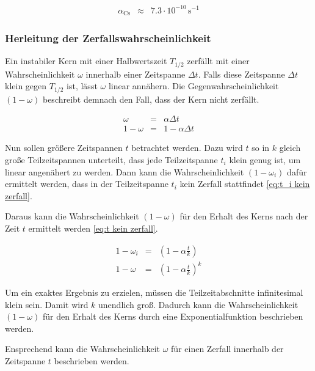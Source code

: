 \documentclass[12pt,a4paper]{scrartcl}
\numberwithin{equation}{section} %
\renewcommand{\[}{} %
\renewcommand{\]}{\noindent} %
\begin{document}
\begin{eqnarray}
	\alpha_\mathrm{Cs} &\approx& 7.3 \cdot 10^{-10} \mathrm{\,s^{-1}}
\end{eqnarray}

\hypertarget{Herleitung Zerfallswahrscheinlichkeit}{\subsubsection{Herleitung der Zerfallswahrscheinlichkeit}\label{Herleitung Zerfallswahrscheinlichkeit}}
Ein instabiler Kern mit einer Halbwertszeit $T_{1/2}$ zerfällt mit einer Wahrscheinlichkeit $\omega$ innerhalb einer Zeitspanne $\Delta t$. Falls diese Zeitspanne $\Delta t$ klein gegen $T_{1/2}$ ist, lässt $\omega$ linear annähern. Die Gegenwahrscheinlichkeit $(1-\omega)$ beschreibt demnach den Fall, dass der Kern nicht zerfällt.

\begin{eqnarray}
	\omega &=& \alpha \Delta t \label{eq:Zerfallswkt linear} \\
	1 - \omega &=& 1 - \alpha \Delta t
\end{eqnarray}

\noindent
Nun sollen größere Zeitspannen $t$ betrachtet werden. Dazu wird $t$ so in $k$ gleich große Teilzeitspannen unterteilt, dass jede Teilzeitspanne $t_i$ klein genug ist, um linear angenähert zu werden. Dann kann die Wahrscheinlichkeit $(1 - \omega_i)$ dafür ermittelt werden, dass in der Teilzeitspanne $t_i$ kein Zerfall stattfindet \eqref{eq:t_i kein zerfall}.

Daraus kann die Wahrscheinlichkeit $(1 - \omega)$ für den Erhalt des Kerns nach der Zeit $t$ ermittelt werden \eqref{eq:t kein zerfall}.

\begin{eqnarray}
	1 - \omega_i &=& \left(1 - \alpha \frac{t}{k}\right) \label{eq:t_i kein zerfall} \\
	1 - \omega &=& \left(1 - \alpha \frac{t}{k} \right)^k \label{eq:t kein zerfall}
\end{eqnarray}

\noindent
Um ein exaktes Ergebnis zu erzielen, müssen die Teilzeitabschnitte infinitesimal klein sein. Damit wird $k$ unendlich groß. Dadurch kann die Wahrscheinlichkeit $(1-\omega)$ für den Erhalt des Kerns durch eine Exponentialfunktion beschrieben werden.

Ensprechend kann die Wahrscheinlichkeit $\omega$ für einen Zerfall innerhalb der Zeitspanne $t$ beschrieben werden.
\end{document}

